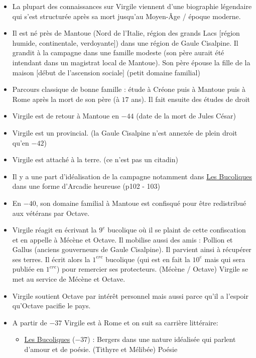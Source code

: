 \documentclass[a4paper, 11pt, hidelinks]{article}
\begin{document}
\begin{itemize}
    \item La plupart des connaissances sur Virgile viennent d'une \og biographie \fg légendaire qui s'est structurée après sa mort jusqu'au
    Moyen-Âge / époque moderne.
    \item Il est né près de Mantoue (Nord de l'Italie, région des grands Lacs [région humide, continentale, verdoyante]) dans une région
    de Gaule Cisalpine. Il grandit à la campagne dans une famille modeste (son père aurait été \og intendant \fg dans un magistrat local de Mantoue).
    Son père épouse la fille de la maison [début de l'ascension sociale] (petit domaine familial)
    \item Parcours classique de \og bonne famille \fg : étude à Créone puis à Mantoue puis à Rome après la mort de son père (à $17$ ans). Il
    fait ensuite des études de droit
    \item Virgile est de retour à Mantoue en $-44$ (date de la mort de Jules César)
    \item Virgile est un provincial. (la Gaule Cisalpine n'est annexée de plein droit qu'en $-42$)
    \item Virgile est attaché à la terre. (ce n'est pas un citadin)
    \item Il y a une part d'idéalisation de la campagne notamment dans \underline{Les Bucoliques} dans une forme \og d'Arcadie heureuse \fg (p102 - 103)
    \item En $-40$, son domaine familial à Mantoue est confisqué pour être redistribué aux vétérans par Octave.
    \item Virgile réagit en écrivant la $9^e$ bucolique où il se plaint de cette confiscation et en appelle à Mécène et Octave. Il
    mobilise aussi des amis : Pollion et Gallus (anciens gouverneurs de Gaule Cisalpine). Il parvient ainsi à récupérer ses terres.
    Il écrit alors la $1^{ere}$ bucolique (qui est en fait la $10^e$ mais qui sera publiée en $1^{ere}$) pour remercier ses protecteurs. (Mécène / Octave)
    Virgile se met au service de Mécène et Octave.
    \item Virgile soutient Octave par intérêt personnel mais aussi parce qu'il a l'espoir qu'Octave pacifie le pays.
    \item A partir de $-37$ Virgile est à Rome et on suit sa carrière littéraire: 
    \begin{itemize}
        \item \underline{Les Bucoliques} ($-37$) : Bergers dans une nature idéalisée qui parlent d'amour et de poésie. (Tithyre et Mélibée) Poésie 

\end{itemize}
\end{itemize}
\end{document}
